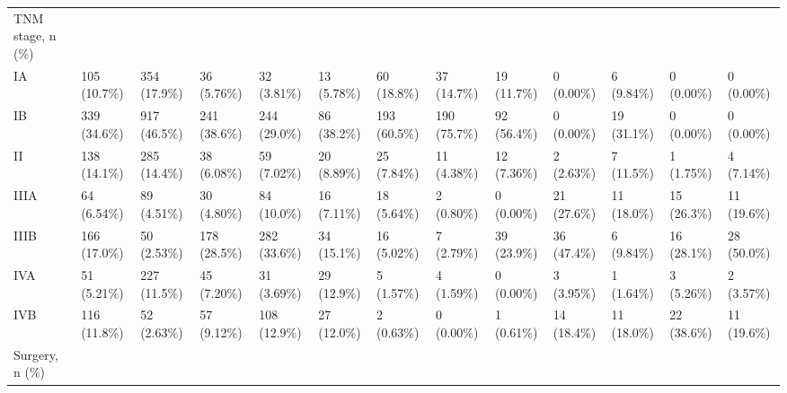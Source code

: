 \begin{landscape}
\begin{center}
\begin{longtable}{p{6.0cm}p{3.0cm}p{3.0cm}p{3.0cm}p{3.0cm}p{3.0cm}p{3.0cm}p{3.0cm}p{3.0cm}p{3.0cm}p{3.0cm}p{3.0cm}p{3.0cm}}
TNM stage, n (\%) &                  &                  &                  &                  &                  &                  &                  &                  &                  &                  &                  &                  \\
    IA &   105 (10.7\%)    &   354 (17.9\%)    &    36 (5.76\%)    &    32 (3.81\%)    &    13 (5.78\%)    &    60 (18.8\%)    &    37 (14.7\%)    &    19 (11.7\%)    &    0 (0.00\%)     &    6 (9.84\%)     &    0 (0.00\%)     &    0 (0.00\%)     \\
    IB &   339 (34.6\%)    &   917 (46.5\%)    &   241 (38.6\%)    &   244 (29.0\%)    &    86 (38.2\%)    &   193 (60.5\%)    &   190 (75.7\%)    &    92 (56.4\%)    &    0 (0.00\%)     &    19 (31.1\%)    &    0 (0.00\%)     &    0 (0.00\%)     \\
    II &   138 (14.1\%)    &   285 (14.4\%)    &    38 (6.08\%)    &    59 (7.02\%)    &    20 (8.89\%)    &    25 (7.84\%)    &    11 (4.38\%)    &    12 (7.36\%)    &    2 (2.63\%)     &    7 (11.5\%)     &    1 (1.75\%)     &    4 (7.14\%)     \\
    IIIA &    64 (6.54\%)    &    89 (4.51\%)    &    30 (4.80\%)    &    84 (10.0\%)    &    16 (7.11\%)    &    18 (5.64\%)    &    2 (0.80\%)     &    0 (0.00\%)     &    21 (27.6\%)    &    11 (18.0\%)    &    15 (26.3\%)    &    11 (19.6\%)    \\
    IIIB &   166 (17.0\%)    &    50 (2.53\%)    &   178 (28.5\%)    &   282 (33.6\%)    &    34 (15.1\%)    &    16 (5.02\%)    &    7 (2.79\%)     &    39 (23.9\%)    &    36 (47.4\%)    &    6 (9.84\%)     &    16 (28.1\%)    &    28 (50.0\%)    \\
    IVA &    51 (5.21\%)    &   227 (11.5\%)    &    45 (7.20\%)    &    31 (3.69\%)    &    29 (12.9\%)    &    5 (1.57\%)     &    4 (1.59\%)     &    0 (0.00\%)     &    3 (3.95\%)     &    1 (1.64\%)     &    3 (5.26\%)     &    2 (3.57\%)     \\
    IVB &   116 (11.8\%)    &    52 (2.63\%)    &    57 (9.12\%)    &   108 (12.9\%)    &    27 (12.0\%)    &    2 (0.63\%)     &    0 (0.00\%)     &    1 (0.61\%)     &    14 (18.4\%)    &    11 (18.0\%)    &    22 (38.6\%)    &    11 (19.6\%)    \\
Surgery, n (\%) &                  &                  &                  &                  &                  &                  &                  &                  &                  &                  &                  &                  \\

\end{longtable}
\end{center}
\end{landscape}

